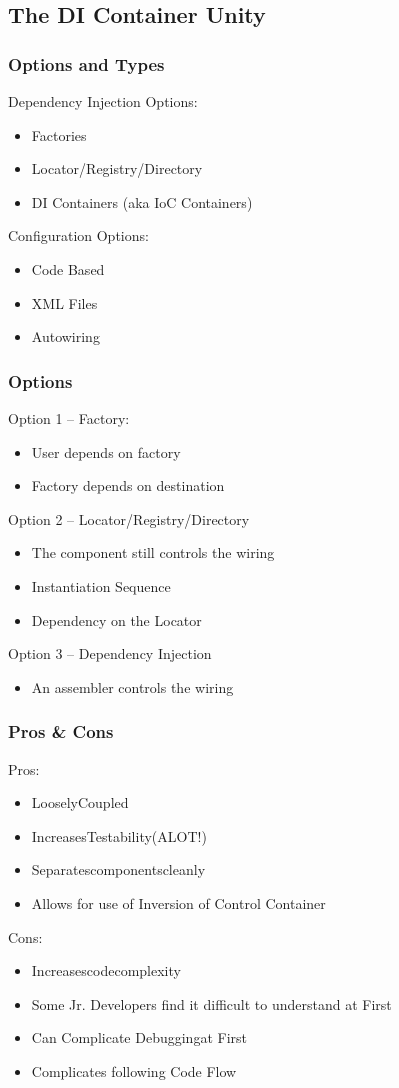 \documentclass[10pt]{article}
\begin{document}
\subsection{The DI Container Unity}
\subsubsection{Options and Types}
Dependency Injection Options:
\begin{itemize}
	\item Factories
	\item Locator/Registry/Directory
	\item DI Containers (aka IoC Containers)
\end{itemize}
Configuration Options:
\begin{itemize}
	\item Code Based
	\item XML Files
	\item Autowiring
\end{itemize}
\subsubsection{Options}
Option 1 – Factory:
\begin{itemize}
	\item User depends on factory
	\item Factory depends on destination
\end{itemize}
Option 2 – Locator/Registry/Directory
\begin{itemize}
	\item The component still controls the wiring
	\item Instantiation Sequence
	\item Dependency on the Locator
\end{itemize}
Option 3 – Dependency Injection
\begin{itemize}
	\item An assembler controls the wiring
\end{itemize}
\subsubsection{Pros \& Cons}
Pros:
\begin{itemize}
	\item LooselyCoupled
	\item IncreasesTestability(ALOT!)
	\item Separatescomponentscleanly
	\item Allows for use of Inversion of Control Container
\end{itemize}
Cons:
\begin{itemize}
	\item Increasescodecomplexity
	\item Some Jr. Developers find it difficult to understand at First
	\item Can Complicate Debuggingat First
	\item Complicates following Code Flow
\end{itemize}
\end{document}
